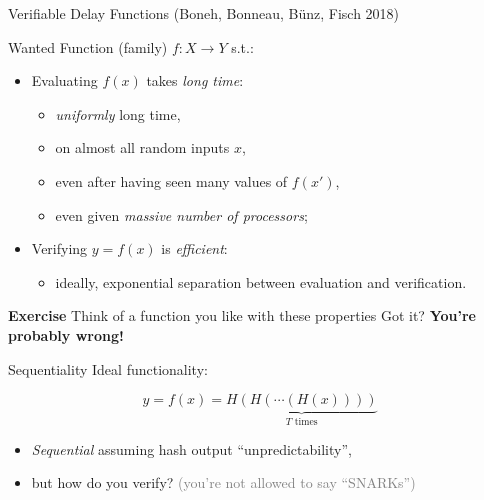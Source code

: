\documentclass[aspectratio=169]{beamer}
\begin{document}
\begin{frame}{Verifiable Delay Functions (Boneh, Bonneau, Bünz, Fisch 2018)}
  \begin{block}{Wanted}
    Function (family) \emph{$f:X\to Y$} s.t.:

    \begin{itemize}
    \item Evaluating $f(x)$ takes \emph{long time}:
      \begin{itemize}
      \item \emph{uniformly} long time,
      \item on almost all random inputs $x$,
      \item even after having seen many values of $f(x')$,
      \item even given \emph{massive number of processors};
      \end{itemize}
    \item Verifying $y=f(x)$ is \emph{efficient}:
      \begin{itemize}
      \item ideally, exponential separation between evaluation and
        verification.
      \end{itemize}
    \end{itemize}
  \end{block}

  \centering
  \pause\vfill
  \textbf{Exercise}
  \pause\vfill
  Think of a function you like with these properties
  \pause\vfill
  Got it?
  \pause\vfill
  \textbf{You're probably wrong!}
\end{frame}


\begin{frame}{Sequentiality}
  Ideal functionality:

  \[y = f(x) = \underbrace{H(H(\cdots(H(x))))}_{T \text{ times}}\]

  \begin{itemize}
  \item \emph{Sequential} assuming hash output ``unpredictability'',
  \item but how do you verify? \textcolor{gray}{(you're not allowed to say ``SNARKs'')}
  \end{itemize}
\end{frame}

\end{document}

